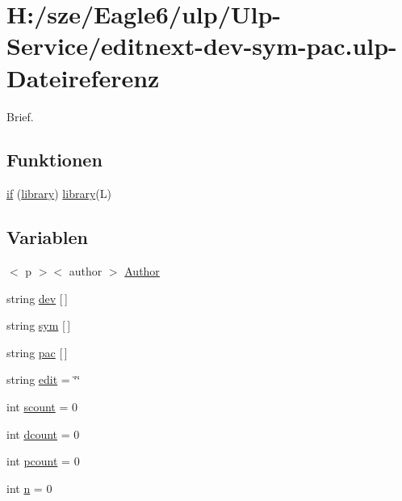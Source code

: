 \hypertarget{editnext-dev-sym-pac_8ulp}{}\section{H\+:/sze/\+Eagle6/ulp/\+Ulp-\/\+Service/editnext-\/dev-\/sym-\/pac.ulp-\/\+Dateireferenz}
\label{editnext-dev-sym-pac_8ulp}


Brief.  


\subsection*{Funktionen}
\begin{DoxyCompactItemize}
\item 
\hyperlink{editnext-dev-sym-pac_8ulp_ab0c49e750749de8998197e07e8e390bb}{if} (\hyperlink{uebersicht_8ulp_a825a5a33f9ea1598f17dac249716ae7e}{library}) \hyperlink{uebersicht_8ulp_a825a5a33f9ea1598f17dac249716ae7e}{library}(L)
\end{DoxyCompactItemize}
\subsection*{Variablen}
\begin{DoxyCompactItemize}
\item 
$<$ p $>$$<$ author $>$ \hyperlink{editnext-dev-sym-pac_8ulp_a4ef1368de21207760cab477f8d8edd5d}{Author}
\item 
string \hyperlink{editnext-dev-sym-pac_8ulp_af87dd7ae8e527b31308923149d6841e1}{dev} \mbox{[}$\,$\mbox{]}
\item 
string \hyperlink{editnext-dev-sym-pac_8ulp_a618376f21731b07801ed522f58f270ed}{sym} \mbox{[}$\,$\mbox{]}
\item 
string \hyperlink{editnext-dev-sym-pac_8ulp_aabdb88a547fddc24ea086330593761c2}{pac} \mbox{[}$\,$\mbox{]}
\item 
string \hyperlink{editnext-dev-sym-pac_8ulp_a03c320515aeefc0c276c51607ca8a5eb}{edit} = \char`\"{}\char`\"{}
\item 
int \hyperlink{editnext-dev-sym-pac_8ulp_a7ad37c8d993b00d12609dd9ae98ec650}{scount} = 0
\item 
int \hyperlink{editnext-dev-sym-pac_8ulp_a3c64e8145810cca064d965e070d2b9ea}{dcount} = 0
\item 
int \hyperlink{editnext-dev-sym-pac_8ulp_a747fe457bac32c34b78b69f9bfefd6f3}{pcount} = 0
\item 
int \hyperlink{editnext-dev-sym-pac_8ulp_a76f11d9a0a47b94f72c2d0e77fb32240}{n} = 0
\end{DoxyCompactItemize}


